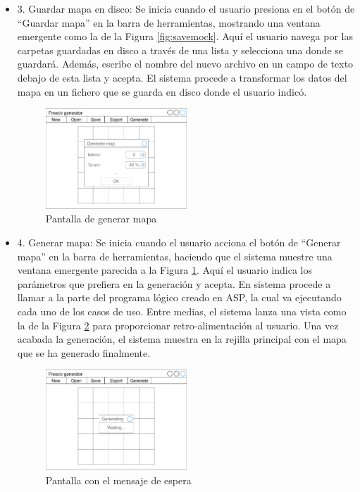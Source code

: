 \begin{itemize}
	\item 3. Guardar mapa en disco: Se inicia cuando el usuario presiona en el botón de ``Guardar mapa'' en la barra de herramientas, mostrando una ventana emergente como la de la Figura \ref{fig:savemock}. Aquí el usuario navega por las carpetas guardadas en disco a través de una lista y selecciona una donde se guardará. Además, escribe el nombre del nuevo archivo en un campo de texto debajo de esta lista y acepta. El sistema procede a transformar los datos del mapa en un fichero que se guarda en disco donde el usuario indicó.
	
	\begin{figure}[!h]
		\centering
		\includegraphics[width=0.5\textwidth]{images/generate-map.pdf}
		\caption{Pantalla de generar mapa}
		\label{fig:generatemock}
	\end{figure}
	
	\item 4. Generar mapa: Se inicia cuando el usuario acciona el botón de ``Generar mapa'' en la barra de herramientas, haciendo que el sistema muestre una ventana emergente parecida a la Figura \ref{fig:generatemock}. Aquí el usuario indica los parámetros que prefiera en la generación y acepta. En sistema procede a llamar a la parte del programa lógico creado en ASP, la cual va ejecutando cada uno de los casos de uso. Entre medias, el sistema lanza una vista como la de la Figura \ref{fig:waitingmock} para proporcionar retro-alimentación al usuario. Una vez acabada la generación, el sistema muestra en la rejilla principal con el mapa que se ha generado finalmente.

	\begin{figure}[!h]
		\centering
		\includegraphics[width=0.5\textwidth]{images/waiting-mock.pdf}
		\caption{Pantalla con el mensaje de espera}
		\label{fig:waitingmock}
	\end{figure}
	

\end{itemize}
